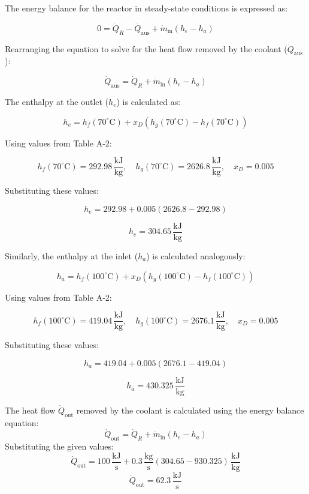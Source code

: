 The energy balance for the reactor in steady-state conditions is expressed as:  

\[
0 = \dot{Q}_R - \dot{Q}_{\text{aus}} + \dot{m}_{\text{in}} \left( h_e - h_a \right)
\]

Rearranging the equation to solve for the heat flow removed by the coolant (\( \dot{Q}_{\text{aus}} \)):  

\[
\dot{Q}_{\text{aus}} = \dot{Q}_R + \dot{m}_{\text{in}} \left( h_e - h_a \right)
\]

The enthalpy at the outlet (\( h_e \)) is calculated as:  

\[
h_e = h_f(70^\circ\text{C}) + x_D \left( h_g(70^\circ\text{C}) - h_f(70^\circ\text{C}) \right)
\]

Using values from Table A-2:  

\[
h_f(70^\circ\text{C}) = 292.98 \, \frac{\text{kJ}}{\text{kg}}, \quad h_g(70^\circ\text{C}) = 2626.8 \, \frac{\text{kJ}}{\text{kg}}, \quad x_D = 0.005
\]

Substituting these values:  

\[
h_e = 292.98 + 0.005 \left( 2626.8 - 292.98 \right)
\]

\[
h_e = 304.65 \, \frac{\text{kJ}}{\text{kg}}
\]

Similarly, the enthalpy at the inlet (\( h_a \)) is calculated analogously:  

\[
h_a = h_f(100^\circ\text{C}) + x_D \left( h_g(100^\circ\text{C}) - h_f(100^\circ\text{C}) \right)
\]

Using values from Table A-2:  

\[
h_f(100^\circ\text{C}) = 419.04 \, \frac{\text{kJ}}{\text{kg}}, \quad h_g(100^\circ\text{C}) = 2676.1 \, \frac{\text{kJ}}{\text{kg}}, \quad x_D = 0.005
\]

Substituting these values:  

\[
h_a = 419.04 + 0.005 \left( 2676.1 - 419.04 \right)
\]

\[
h_a = 430.325 \, \frac{\text{kJ}}{\text{kg}}
\]

The heat flow \( \dot{Q}_{\text{out}} \) removed by the coolant is calculated using the energy balance equation:  
\[
\dot{Q}_{\text{out}} = \dot{Q}_R + \dot{m}_{\text{in}} \left( h_e - h_a \right)
\]  
Substituting the given values:  
\[
\dot{Q}_{\text{out}} = 100 \, \frac{\text{kJ}}{\text{s}} + 0.3 \, \frac{\text{kg}}{\text{s}} \left( 304.65 - 930.325 \right) \, \frac{\text{kJ}}{\text{kg}}
\]  
\[
\dot{Q}_{\text{out}} = 62.3 \, \frac{\text{kJ}}{\text{s}}
\]